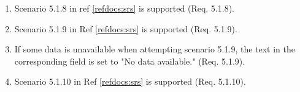 \documentclass[a4paper]{article}
\newlength{\testlabellength}
\newenvironment{testlist}{\begin{enumerate}[label=\bfseries Instruction \thesubsection.\arabic* , labelindent=0pt, labelwidth=\testlabellength , leftmargin=2cm]}{\end{enumerate}}
\newenvironment{precondition}{
{\color{white}BLARG}\\ 
\textbf{Precondition}
\begin{itemize}[labelindent=0cm, labelwidth=2cm , leftmargin=1cm]
}
{\end{itemize}}
\newenvironment{instruction}{
\textbf{Instructions:}
\begin{enumerate}[label=\bfseries  \arabic*., labelindent=0cm, labelwidth=2cm , leftmargin=1cm]
}
{\end{enumerate}}
\newenvironment{postcondition}{
\textbf{Postcondition:}
\begin{itemize}[labelindent=0cm, labelwidth=2cm , leftmargin=1cm]
}
{\end{itemize}}
\begin{document}
\begin{appendices}
\begin{testlist}
	\item Scenario 5.1.8 in ref \ref{refdocs:srs} is supported (Req. 5.1.8).

	\item Scenario 5.1.9 in Ref \ref{refdocs:srs} is supported (Req. 5.1.9).

	\item If some data is unavailable when attempting scenario 5.1.9, the text in the corresponding field is set to "No data available." (Req. 5.1.9).

	\item Scenario 5.1.10 in Ref \ref{refdocs:srs} is supported (Req. 5.1.10).


\end{testlist}
\end{appendices}
\end{document}
